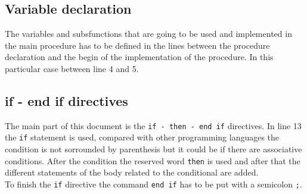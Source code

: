 \documentclass[paper=a4, fontsize=11pt]{scrartcl} %
\numberwithin{equation}{section} %
\numberwithin{figure}{section} %
\numberwithin{table}{section} %
\begin{document}
\subsection{Variable declaration}
The variables and subsfunctions that are going to be used and implemented in the main procedure has to be defined in the lines between the procedure declaration and the begin of the implementation of the procedure. In this particular case between line 4 and 5.

\subsection{if - end if  directives}
The main part of this document is the \verb|if - then - end if| directives. In line 13 the \verb|if| statement is used, compared with other programming languages the condition is not sorrounded by parenthesis but it could be if there are associative conditions. After the condition the reserved word \verb|then| is used and after that the different statements of the body related to the conditional are added.\\

To finish the \verb|if| directive the command \verb|end if| has to be put with a semicolon \verb|;|. 
\end{document}
